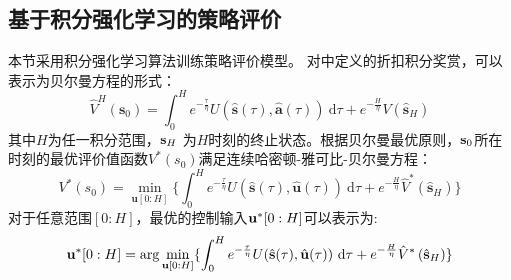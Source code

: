 \subsection{基于积分强化学习的策略评价}
本节采用积分强化学习算法\cite{Guo2019}训练策略评价模型。
对中定义的折扣积分奖赏，可以表示为贝尔曼方程的形式：
\begin{equation}
  \hat{V}^{H}\left(\mathbf{s}_{0}\right)=\int_{0}^{H} e^{-\frac{\tau}{\eta}} U(\hat{\mathbf{s}}(\tau), \hat{\mathbf{a}}(\tau)) \mathrm{~d} \tau+e^{-\frac{H}{\eta}} {V}\left(\hat{\mathbf{s}}_{H}\right)
  \label{equ:J_bellman}
\end{equation}
其中$H$为任一积分范围，$\mathbf s_H$ 为$H$时刻的终止状态。根据贝尔曼最优原则，$\mathbf s_0$所在时刻的最优评价值函数$V^*(s_0)$满足连续哈密顿-雅可比-贝尔曼方程：
\begin{equation}
\label{equ:J_star} 
V ^ { * } \left( s_0 \right) = \min _{ \mathbf u[0:H ] } \{ \int_0^H e^{-\frac{\tau}{\eta}} U(\hat{\mathbf{s}}(\tau), \hat{\mathbf{u}}(\tau)) \mathrm{~d}\tau  + e^{-\frac{H}{\eta}} \hat{V}^*\left(\hat{\mathbf{s}}_{H}\right)\}
\end{equation}
对于任意范围$[0:H]$，最优的控制输入$\mathbf u^*[0:H]$可以表示为:
\begin{equation}
\mathbf u^*[  0:H ] =\arg \min _ { \mathbf u[0:H ] }\{ \int_0^H e^{-\frac{\tau}{\eta}} U(\hat{\mathbf{s}}(\tau), \hat{\mathbf{u}}(\tau))\mathrm{~d}\tau  + e^{-\frac{H}{\eta}} \hat{V}^*\left(\hat{\mathbf{s}}_{H}\right)\}
\label{equ:VI_u}
\end{equation}


